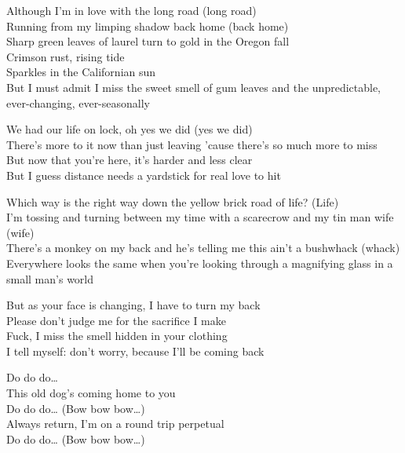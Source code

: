 
Although I'm in love with the long road (long road) \\
Running from my limping shadow back home (back home) \\
Sharp green leaves of laurel turn to gold in the Oregon fall \\
Crimson rust, rising tide \\
Sparkles in the Californian sun \\
But I must admit I miss the sweet smell of gum leaves and the unpredictable, ever-changing, ever-seasonally \\


We had our life on lock, oh yes we did (yes we did) \\
There's more to it now than just leaving 'cause there's so much more to miss \\
But now that you're here, it's harder and less clear \\
But I guess distance needs a yardstick for real love to hit \\


Which way is the right way down the yellow brick road of life? (Life) \\
I'm tossing and turning between my time with a scarecrow and my tin man wife (wife) \\
There's a monkey on my back and he's telling me this ain't a bushwhack (whack) \\
Everywhere looks the same when you're looking through a magnifying glass in a small man's world \\


But as your face is changing, I have to turn my back \\
Please don't judge me for the sacrifice I make \\
Fuck, I miss the smell hidden in your clothing \\
I tell myself: don't worry, because I'll be coming back \\


Do do do… \\
This old dog's coming home to you \\
Do do do… (Bow bow bow…) \\
Always return, I'm on a round trip perpetual \\
Do do do… (Bow bow bow…) \\

